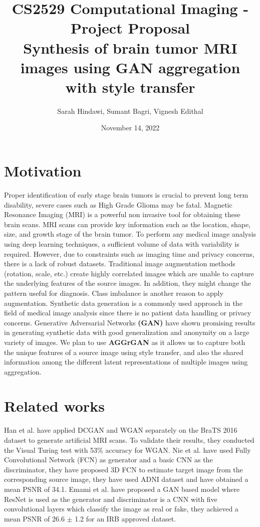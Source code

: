 \documentclass[10pt]{extarticle}
\title{
    {\large CS2529 Computational Imaging - Project Proposal} \\
    Synthesis of brain tumor MRI images using GAN aggregation with style transfer
}
\author{Sarah Hindawi, Sumant Bagri, Vignesh Edithal}
\date{November 14, 2022}
\begin{document}
\maketitle

\section{Motivation}

\cite{Mukherkjee2022} Proper identification of early stage brain tumors is crucial to prevent long term disability, severe 
cases such as High Grade Glioma may be fatal. Magnetic Resonance Imaging (MRI) is a powerful non invasive tool for obtaining 
these brain scans. MRI scans can provide key information such as the location, shape, size, and growth stage of the brain 
tumor. To perform any medical image analysis using deep learning techniques, a sufficient volume of data with variability is 
required. However, due to constraints such as imaging time and privacy concerns, there is a lack of robust datasets. 
Traditional image augmentation methods (rotation, scale, etc.) create highly correlated images which are unable to capture 
the underlying features of the source images. In addition, they might change the pattern useful for diagnosis. Class 
imbalance is another reason to apply augmentation. Synthetic data generation is a commonly used approach in the field of 
medical image analysis since there is no patient data handling or privacy concerns. Generative Adversarial Networks \textbf
{(GAN)} have shown promising results in generating synthetic data with good generalization and anonymity on a large variety 
of images. We plan to use \textbf{AGGrGAN} \cite{Mukherkjee2022} as it allows us to capture both the unique features of a 
source image using style transfer, and also the shared information among the different latent representations of multiple 
images using aggregation.

\section{Related works}

\cite{Mukherkjee2022} Han et al. \cite{Han2018} have applied DCGAN and WGAN separately on the BraTS 2016 dataset to generate 
artificial MRI scans. To validate their results, they conducted the Visual Turing test with 53\% accuracy for WGAN. Nie et 
al. \cite{Nie2018} have used Fully Convolutional Network (FCN) as generator and a basic CNN as the discriminator, they have 
proposed 3D FCN to estimate target image from the corresponding source image, they have used ADNI dataset and have obtained a 
mean PSNR of 34.1. Emami et al. \cite{Emami2018} have proposed a GAN based model where ResNet is used as the generator and 
discriminator is a CNN with five convolutional layers which classify the image as real or fake, they achieved a mean PSNR of 
26.6 $\pm$ 1.2 for an IRB approved dataset.
\end{document}
